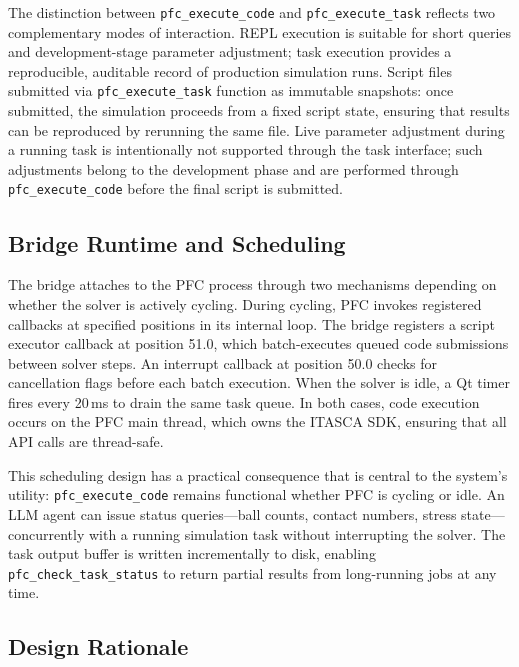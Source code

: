 The distinction between \texttt{pfc\_execute\_code} and \texttt{pfc\_execute\_task} reflects two complementary modes of interaction. REPL execution is suitable for short queries and development-stage parameter adjustment; task execution provides a reproducible, auditable record of production simulation runs. Script files submitted via \texttt{pfc\_execute\_task} function as immutable snapshots: once submitted, the simulation proceeds from a fixed script state, ensuring that results can be reproduced by rerunning the same file. Live parameter adjustment during a running task is intentionally not supported through the task interface; such adjustments belong to the development phase and are performed through \texttt{pfc\_execute\_code} before the final script is submitted.

\subsection{Bridge Runtime and Scheduling}
\label{sec:design:bridge}


The bridge attaches to the PFC process through two mechanisms depending on whether the solver is actively cycling. During cycling, PFC invokes registered callbacks at specified positions in its internal loop. The bridge registers a script executor callback at position 51.0, which batch-executes queued code submissions between solver steps. An interrupt callback at position 50.0 checks for cancellation flags before each batch execution. When the solver is idle, a Qt timer fires every 20\,ms to drain the same task queue. In both cases, code execution occurs on the PFC main thread, which owns the ITASCA SDK, ensuring that all API calls are thread-safe.

This scheduling design has a practical consequence that is central to the system's utility: \texttt{pfc\_execute\_code} remains functional whether PFC is cycling or idle. An LLM agent can issue status queries---ball counts, contact numbers, stress state---concurrently with a running simulation task without interrupting the solver. The task output buffer is written incrementally to disk, enabling \texttt{pfc\_check\_task\_status} to return partial results from long-running jobs at any time.

\subsection{Design Rationale}
\label{sec:design:rationale}

